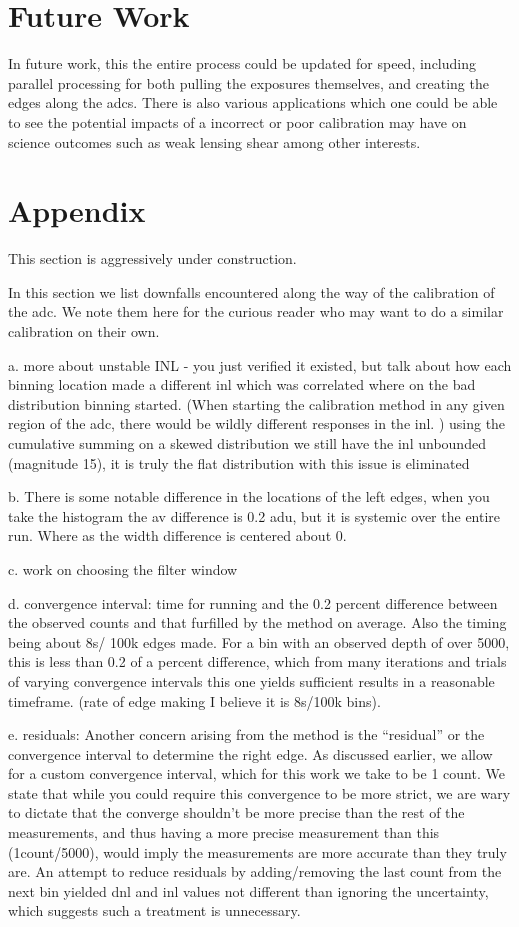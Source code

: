 \documentclass[11pt, letterpaper]{article}
\begin{document}
\section{Future Work}
\indent


In future work, this the entire process could be updated for speed, including parallel processing for both pulling the exposures themselves, and creating the edges along the adcs. 
There is also various applications which one could be able to see the potential impacts of a incorrect or poor calibration may have on science outcomes such as weak lensing shear among other interests. 

\section{Appendix}
This section is aggressively under construction. 

In this section we list downfalls encountered along the way of the calibration of the adc. We note them here for the curious reader who may want to do a similar calibration on their own. 

a. more about unstable INL - you just verified it existed, but talk about how each binning location made a different inl which was correlated where on the bad distribution binning started. (When starting the calibration method in any given region of the adc, there would be wildly different responses in the inl. ) using the cumulative summing on a skewed distribution we still have the inl unbounded (magnitude 15), it is truly the flat distribution with this issue is eliminated 

b. There is some notable difference in the locations of the left edges, when you take the histogram the av difference is 0.2 adu, but it is systemic over the entire run. Where as the width difference is centered about 0. 

c. work on choosing the filter window 

d. convergence interval: time for running and the 0.2 percent difference between the observed counts and that furfilled by the method on average. Also the timing being about 8s/ 100k edges made. For a bin with an observed depth of over 5000, this is less than 0.2 of a percent difference, which from many iterations and trials of varying convergence intervals this one yields sufficient results in a reasonable timeframe. (rate of edge making I believe it is 8s/100k bins). 


e. residuals: Another concern arising from the method is the “residual” or the convergence interval to determine the right edge. 
As discussed earlier, we allow for a custom convergence interval, which for this work we take to be 1 count. 
We state that while you could require this convergence to be more strict, we are wary to dictate that the converge shouldn’t be more precise than the rest of the measurements, and thus having a more precise measurement than this (1count/5000), would imply the measurements are more accurate than they truly are. 
An attempt to reduce residuals by adding/removing the last count from the next bin yielded dnl and inl values not different than ignoring the uncertainty, which suggests such a treatment is unnecessary. 
\end{document}

